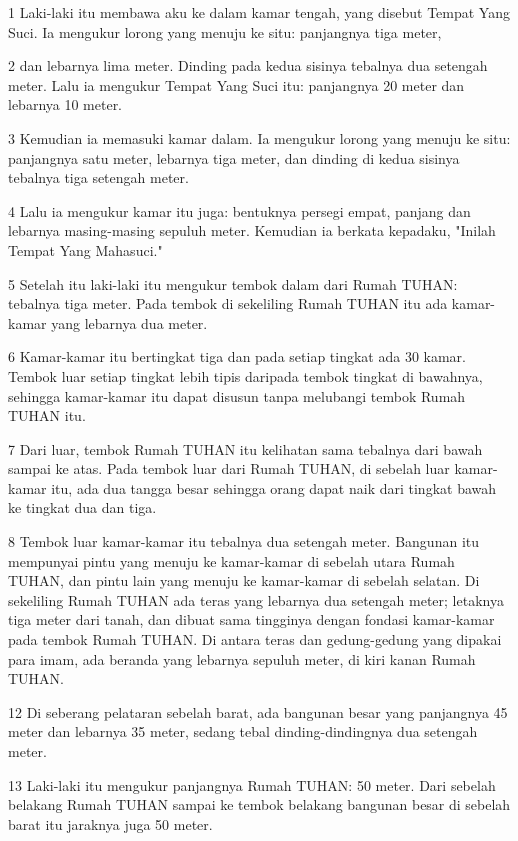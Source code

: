 \par 1 Laki-laki itu membawa aku ke dalam kamar tengah, yang disebut Tempat Yang Suci. Ia mengukur lorong yang menuju ke situ: panjangnya tiga meter,
\par 2 dan lebarnya lima meter. Dinding pada kedua sisinya tebalnya dua setengah meter. Lalu ia mengukur Tempat Yang Suci itu: panjangnya 20 meter dan lebarnya 10 meter.
\par 3 Kemudian ia memasuki kamar dalam. Ia mengukur lorong yang menuju ke situ: panjangnya satu meter, lebarnya tiga meter, dan dinding di kedua sisinya tebalnya tiga setengah meter.
\par 4 Lalu ia mengukur kamar itu juga: bentuknya persegi empat, panjang dan lebarnya masing-masing sepuluh meter. Kemudian ia berkata kepadaku, "Inilah Tempat Yang Mahasuci."
\par 5 Setelah itu laki-laki itu mengukur tembok dalam dari Rumah TUHAN: tebalnya tiga meter. Pada tembok di sekeliling Rumah TUHAN itu ada kamar-kamar yang lebarnya dua meter.
\par 6 Kamar-kamar itu bertingkat tiga dan pada setiap tingkat ada 30 kamar. Tembok luar setiap tingkat lebih tipis daripada tembok tingkat di bawahnya, sehingga kamar-kamar itu dapat disusun tanpa melubangi tembok Rumah TUHAN itu.
\par 7 Dari luar, tembok Rumah TUHAN itu kelihatan sama tebalnya dari bawah sampai ke atas. Pada tembok luar dari Rumah TUHAN, di sebelah luar kamar-kamar itu, ada dua tangga besar sehingga orang dapat naik dari tingkat bawah ke tingkat dua dan tiga.
\par 8 Tembok luar kamar-kamar itu tebalnya dua setengah meter. Bangunan itu mempunyai pintu yang menuju ke kamar-kamar di sebelah utara Rumah TUHAN, dan pintu lain yang menuju ke kamar-kamar di sebelah selatan. Di sekeliling Rumah TUHAN ada teras yang lebarnya dua setengah meter; letaknya tiga meter dari tanah, dan dibuat sama tingginya dengan fondasi kamar-kamar pada tembok Rumah TUHAN. Di antara teras dan gedung-gedung yang dipakai para imam, ada beranda yang lebarnya sepuluh meter, di kiri kanan Rumah TUHAN.
\par 12 Di seberang pelataran sebelah barat, ada bangunan besar yang panjangnya 45 meter dan lebarnya 35 meter, sedang tebal dinding-dindingnya dua setengah meter.
\par 13 Laki-laki itu mengukur panjangnya Rumah TUHAN: 50 meter. Dari sebelah belakang Rumah TUHAN sampai ke tembok belakang bangunan besar di sebelah barat itu jaraknya juga 50 meter.
